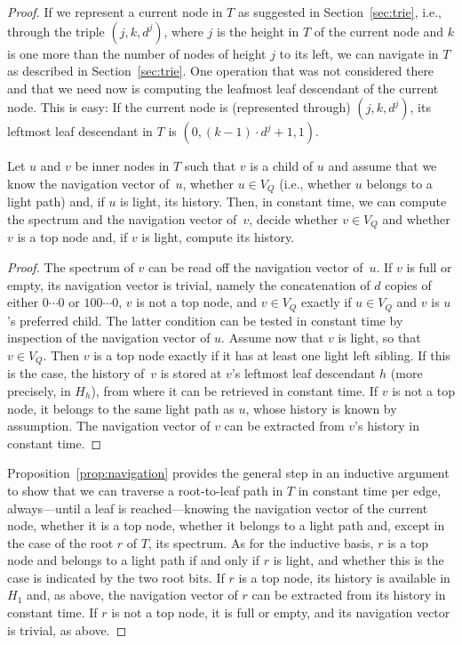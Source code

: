 \documentclass[envcountsame,envcountsect,undated,nolinenumbers]{lnthi}
\begin{document}
\begin{proof}
If we represent a current node in $T$ as suggested
in Section~\ref{sec:trie}, i.e., through
the triple $(j,k,d^j)$, where $j$ is the height
in $T$ of the current node and $k$ is one more
than the number of nodes of height $j$ to its left,
we can navigate in $T$ as described
in Section~\ref{sec:trie}.
One operation that was not considered there and that
we need now is computing the leafmost leaf
descendant of the current node.
This is easy:
If the current node is (represented through)
$(j,k,d^j)$, its leftmost leaf descendant in $T$ is
$(0,(k-1)\cdot d^j+1,1)$.

\begin{proposition}
\label{prop:navigation}Let $u$ and $v$ be inner nodes in $T$ such that
$v$ is a child of $u$ and assume that we know
the navigation vector of~$u$, whether $u\in V_Q$
(i.e., whether $u$ belongs to a light path)
and, if $u$ is light, its history.
Then, in constant time, we can compute the spectrum
and the navigation vector of~$v$,
decide whether $v\in V_Q$
and whether $v$ is a top node and, if
$v$ is light, compute its history.
\end{proposition}

\begin{proof}
The spectrum of $v$ can be read off the
navigation vector of~$u$.
If $v$ is full or empty, its navigation vector
is trivial, namely the concatenation of $d$
copies of either $0\cdots 0$ or $100\cdots 0$,
$v$ is not a top node, and $v\in V_Q$
exactly if $u\in V_Q$ and $v$ is
$u$'s preferred child.
The latter condition can be tested in constant
time by inspection of
the navigation vector of $u$.
Assume now that $v$ is light, so that $v\in V_Q$.
Then $v$ is a top node exactly
if it has at least one light
left sibling.
If this is the case, the history of~$v$
is stored at $v$'s leftmost leaf descendant $h$
(more precisely, in $H_h$),
from where it can be retrieved in constant time.
If $v$ is not a top node, it belongs to the
same light path as $u$,
whose history is known by assumption.
The navigation vector of $v$ can be extracted
from $v$'s history in constant time.
\end{proof}

Proposition~\ref{prop:navigation} provides the general
step in an inductive argument to show that we can
traverse a root-to-leaf path in $T$ in constant
time per edge, always---until a
leaf is reached---knowing
the navigation vector of the current node,
whether it is a top node,
whether it belongs to a light path and, except
in the case of the root $r$ of $T$,
its spectrum.
As for the inductive basis, $r$
is a top node and belongs to a light
path if and only if $r$ is light,
and whether this is the case is
indicated by the two root bits.
If $r$ is a top node, its history
is available
in $H_1$ and, as above, the navigation vector
of $r$ can be extracted from its history in constant time.
If $r$ is not a top node, it is full or empty,
and its navigation vector is trivial, as above.


\end{proof}
\end{document}
